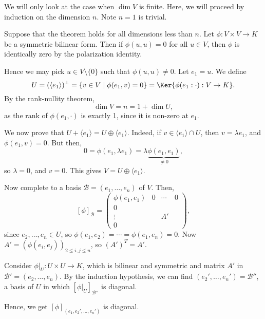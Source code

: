 \documentclass[12pt]{article}
\begin{document}
\begin{proofbox}
	We will only look at the case when $\dim V$ is finite. Here, we will proceed by induction on the dimension $n$. Note $n = 1$ is trivial.

	Suppose that the theorem holds for all dimensions less than $n$. Let $\phi : V \times V \to K$ be a symmetric bilinear form. Then if $\phi(u, u) = 0$ for all $u \in V$, then $\phi$ is identically zero by the polarization identity.

	Hence we may pick $u \in V \setminus \{0\}$ such that $\phi(u, u) \neq 0$. Let $e_1 = u$. We define
	\[
		U = (\langle e_1 \rangle)^{\perp} = \{v \in V \mid \phi(e_1, v) = 0\} = \Ker \{ \phi(e_1: \cdot) : V \to K\}
	.\]
	By the rank-nullity theorem,
	\[
	\dim V = n = 1 + \dim U
	,\]
	as the rank of $\phi(e_1, \cdot)$ is exactly 1, since it is non-zero at $e_1$.

	We now prove that $U + \langle e_1 \rangle = U \oplus \langle e_1 \rangle$. Indeed, if $v \in \langle e_1 \rangle \cap U$, then $v = \lambda e_1$, and $\phi(e_1, v) = 0$. But then,
	\[
		0 = \phi(e_1, \lambda e_1) = \lambda \underbrace{\phi(e_1, e_1)}_{\neq 0}
	,\]
	so $\lambda = 0$, and $v = 0$. This gives $V = U \oplus \langle e_1 \rangle$.

	Now complete to a basis $\mathcal{B} = (e_1, \ldots, e_n)$ of $V$. Then,
	\[
		[\phi]_{\mathcal{B}} = 
		\begin{pmatrix}
			\phi(e_1, e_1) & 0 & \cdots & 0 \\
			0 & & & \\
			\vdots & & A' & \\
			0 & & &
		\end{pmatrix}
	,\]
	since $e_2, \ldots, e_n \in U$, so $\phi(e_1, e_2) = \cdots = \phi(e_1, e_n) = 0$. Now $A' = (\phi(e_i, e_j))_{2 \leq i, j \leq n}$, so $(A')^{T} = A'$.

	Consider $\phi|_{U} : U \times U \to K$, which is bilinear and symmetric and matrix $A'$ in $\mathcal{B}' = (e_2, \ldots, e_n)$. By the induction hypothesis, we can find $(e_2', \ldots, e_n') = \mathcal{B}''$, a basis of $U$ in which $[\phi|_{U}]_{\mathcal{B}''}$ is diagonal.

	Hence, we get $[\phi]_{(e_1, e_2', \ldots, e_n')}$ is diagonal.
\end{proofbox}
\end{document}
